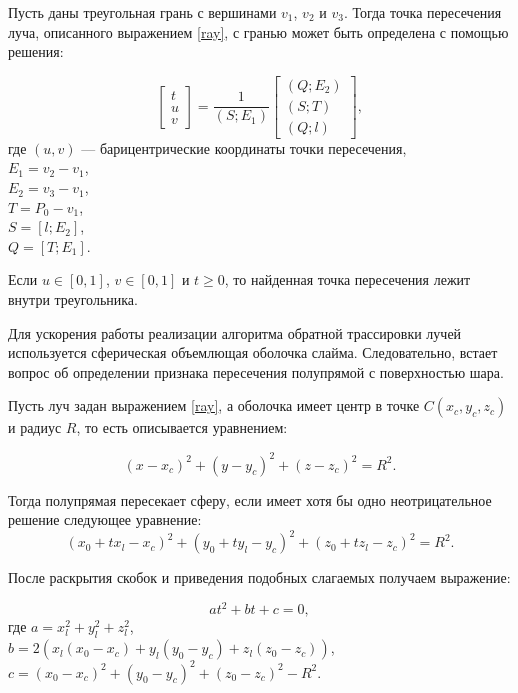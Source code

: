 Пусть даны треугольная грань с вершинами $v_1$, $v_2$ и $v_3$. Тогда точка пересечения луча, описанного выражением \eqref{ray}, с гранью может быть определена с помощью решения:

\begin{equation}\label{bar}
	\begin{bmatrix}
		t\\
		u\\
		v
	\end{bmatrix}
	= \frac{1}{(S; E_1)}
	\begin{bmatrix}
		(Q; E_2)\\
		(S; T)\\
		(Q; l)
	\end{bmatrix},
\end{equation}
где $(u, v)$ --- барицентрические координаты точки пересечения,\\
\text{~~~~~~}$E_1 = v_2 - v_1$,\\
\text{~~~~~~}$E_2 = v_3 - v_1$,\\
\text{~~~~~~}$T = P_0 - v_1$,\\
\text{~~~~~~}$S = [l; E_2]$,\\
\text{~~~~~~}$Q = [T; E_1]$.

Если $u \in [0, 1]$, $v \in [0, 1]$ и $t \ge 0$, то найденная точка пересечения лежит внутри треугольника.

Для ускорения работы реализации алгоритма обратной трассировки лучей используется сферическая объемлющая оболочка слайма. Следовательно, встает вопрос об определении признака пересечения полупрямой с поверхностью шара.

Пусть луч задан выражением \eqref{ray}, а оболочка имеет центр в точке $C(x_c, y_c, z_c)$ и радиус $R$, то есть описывается уравнением:

\begin{equation}\label{sphere}
	(x - x_c)^2 + (y - y_c)^2 + (z - z_c)^2 = R^2.
\end{equation}

Тогда полупрямая пересекает сферу, если имеет хотя бы одно неотрицательное решение следующее уравнение:
\begin{equation}\label{spheq1}
	(x_0 + tx_l - x_c)^2 + (y_0 + ty_l - y_c)^2 + (z_0 + tz_l - z_c)^2 = R^2.
\end{equation}

После раскрытия скобок и приведения подобных слагаемых получаем выражение:

\begin{equation}\label{spheq2}
	at^2 + bt + c = 0,
\end{equation}
где $a = x_l^2 + y_l^2 + z_l^2$,\\
\text{~~~~~~}$b = 2(x_l(x_0 - x_c) + y_l(y_0 - y_c) + z_l(z_0 - z_c))$,\\
\text{~~~~~~}$c = (x_0 - x_c)^2 + (y_0 - y_c)^2 + (z_0 - z_c) ^ 2 - R^2$.

